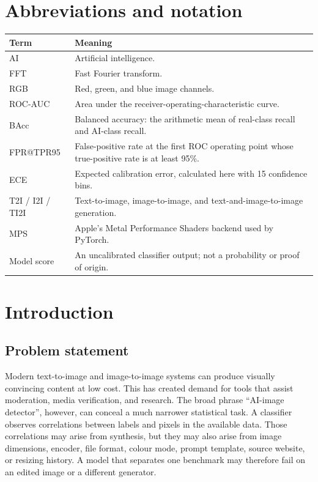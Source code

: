 \documentclass[12pt,a4paper]{article}
\begin{document}
\section*{Abbreviations and notation}

\begin{tabularx}{\textwidth}{@{}p{3.2cm}Y@{}}
\toprule
Term & Meaning\\
\midrule
AI & Artificial intelligence.\\
FFT & Fast Fourier transform.\\
RGB & Red, green, and blue image channels.\\
ROC-AUC & Area under the receiver-operating-characteristic curve.\\
BAcc & Balanced accuracy: the arithmetic mean of real-class recall and AI-class recall.\\
FPR@TPR95 & False-positive rate at the first ROC operating point whose true-positive rate is at least 95\%.\\
ECE & Expected calibration error, calculated here with 15 confidence bins.\\
T2I / I2I / TI2I & Text-to-image, image-to-image, and text-and-image-to-image generation.\\
MPS & Apple's Metal Performance Shaders backend used by PyTorch.\\
Model score & An uncalibrated classifier output; not a probability or proof of origin.\\
\bottomrule
\end{tabularx}
\clearpage

\section{Introduction}

\subsection{Problem statement}

Modern text-to-image and image-to-image systems can produce visually convincing content at low
cost. This has created demand for tools that assist moderation, media verification, and research.
The broad phrase ``AI-image detector'', however, can conceal a much narrower statistical task. A
classifier observes correlations between labels and pixels in the available data. Those
correlations may arise from synthesis, but they may also arise from image dimensions, encoder,
file format, colour mode, prompt template, source website, or resizing history. A model that
separates one benchmark may therefore fail on an edited image or a different generator.
\end{document}
